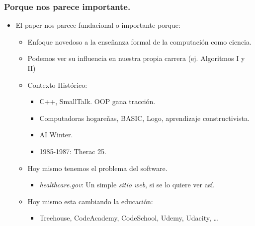 \documentclass[ignorenonframetext,]{beamer}
\begin{document}
\begin{frame}\frametitle{Porque nos parece importante.}

\begin{itemize}[<+->]
\itemsep1pt\parskip0pt
\item
  El paper nos parece fundacional o importante porque:

  \begin{itemize}[<+->]
  \itemsep1pt\parskip0pt
  \item
    Enfoque novedoso a la enseñanza formal de la computación como
    ciencia.
  \item
    Podemos ver su influencia en nuestra propia carrera (ej. Algoritmos
    I y II)
  \item
    Contexto Histórico:

    \begin{itemize}[<+->]
    \itemsep1pt\parskip0pt
    \item
      C++, SmallTalk. OOP gana tracción.
    \item
      Computadoras hogareñas, BASIC, Logo, aprendizaje constructivista.
    \item
      AI Winter.
    \item
      1985-1987: Therac 25.
    \end{itemize}
  \item
    Hoy mismo tenemos el problema del software.

    \begin{itemize}[<+->]
    \itemsep1pt\parskip0pt
    \item
      \emph{healthcare.gov}: Un simple \emph{sitio web}, si se lo quiere
      ver así.
    \end{itemize}
  \item
    Hoy mismo esta cambiando la educación:

    \begin{itemize}[<+->]
    \itemsep1pt\parskip0pt
    \item
      Treehouse, CodeAcademy, CodeSchool, Udemy, Udacity, \ldots{}
    \end{itemize}
  \end{itemize}
\end{itemize}

\end{frame}
\end{document}
